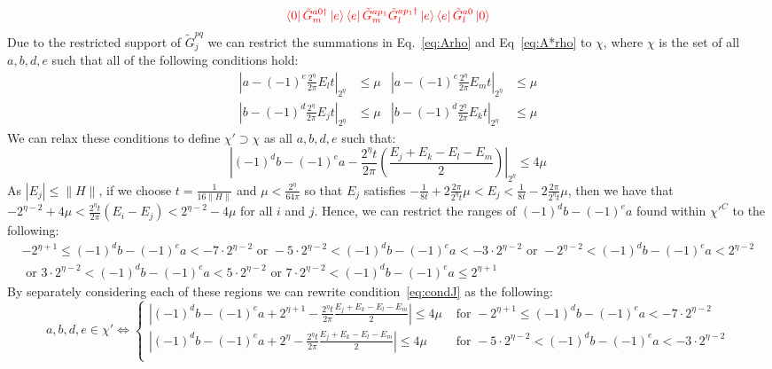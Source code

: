 \documentclass[aps,floatfix,10pt,amssymb,amsfont,amsmath,superscriptaddress,float,nofootinbib,longbibliography,nobalancelastpage,twocolumn]{revtex4-2}
\begin{document}
\begin{widetext}
\begin{multline}
    \textcolor{red}{\bra{0}\tilde G_m^{a0\dagger}\ket{e}\bra{e}\tilde G_m^{ap_1}\tilde G_l^{ap_1\dagger}\ket{e}\bra{e}\tilde G_l^{a0}\ket{0}}
        \label{eq:A*rho}  
\end{multline}
Due to the restricted support of $\tilde G^{pq}_j$ we can restrict the summations in Eq.~\eqref{eq:Arho} and Eq~\eqref{eq:A*rho} to $\chi$, where $\chi$ is the set of all $a,b,d,e$ such that all of the following conditions hold:
\begin{equation}
\begin{aligned}
    |a-(-1)^e\frac{2^{\eta}}{2\pi}E_lt|_{2^{\eta}} &\leq \mu  &|a-(-1)^e\frac{2^{\eta}}{2\pi}E_mt|_{2^{\eta}} &\leq \mu\\
    |b-(-1)^{d}\frac{2^{\eta}}{2\pi}E_jt|_{2^{\eta}} &\leq \mu   &|b-(-1)^{d}\frac{2^{\eta}}{2\pi}E_kt|_{2^{\eta}}& \leq \mu
\end{aligned}
\end{equation}
 We can relax these conditions to define $\chi' \supset \chi$  as all $a,b, d, e$ such that:
\begin{equation}
\label{eq:condJ}
        |(-1)^db-(-1)^ea -\frac{2^{\eta}t}{2\pi}(\frac{E_j+E_k-E_l-E_m}{2})|_{2^{\eta}} \leq 4\mu
\end{equation}
As $|E_j| \leq \|H\|$, if we choose $t = \frac{1}{16\|H\|}$ and $\mu < \frac{2^{\eta}}{64\pi}$ so that $E_j$ satisfies $-\frac{1}{8t} + 2\frac{2\pi}{2^{\eta}t}\mu < E_j < \frac{1}{8t} - 2\frac{2\pi}{2^{\eta}t}\mu$, then we have that $-2^{\eta-2}+4\mu < \frac{2^{\eta}t}{2\pi}(E_i -E_j) < 2^{\eta-2}-4\mu$ for all $i$ and $j$. Hence, we can restrict the ranges of $(-1)^db-(-1)^ea$ found within $\chi'^C$ to the following:
\begin{multline}
    -2^{\eta+1}\leq(-1)^db-(-1)^ea<-7\cdot2^{\eta-2} \text{ or } -5\cdot2^{\eta-2}< (-1)^db-(-1)^ea < -3\cdot2^{\eta-2} \text{ or }-2^{\eta-2}< (-1)^db-(-1)^ea < 2^{\eta-2}\\ \text{ or } 3\cdot2^{\eta-2}< (-1)^db-(-1)^ea < 5\cdot2^{\eta-2}\text{ or } 7\cdot2^{\eta-2}< (-1)^db-(-1)^ea \leq 2^{\eta+1}
\end{multline}
By separately considering each of these regions we can rewrite condition~\eqref{eq:condJ} as the following:
\begin{equation}
    a,b,d,e \in \chi' \iff \begin{cases}
    |(-1)^db-(-1)^ea+2^{\eta+1}-\frac{2^{\eta}t}{2\pi}\frac{E_j+E_k-E_l-E_m}{2}|\leq 4\mu&\text{ for }-2^{\eta+1}\leq(-1)^db-(-1)^ea<-7\cdot2^{\eta-2}\\
    |(-1)^db-(-1)^ea+2^{\eta}-\frac{2^{\eta}t}{2\pi}\frac{E_j+E_k-E_l-E_m}{2}|\leq 4\mu&\text{ for }-5\cdot 2^{\eta-2}< (-1)^db-(-1)^ea < -3\cdot2^{\eta-2}\\

\end{cases}
\end{equation}
\end{widetext}
\end{document}
